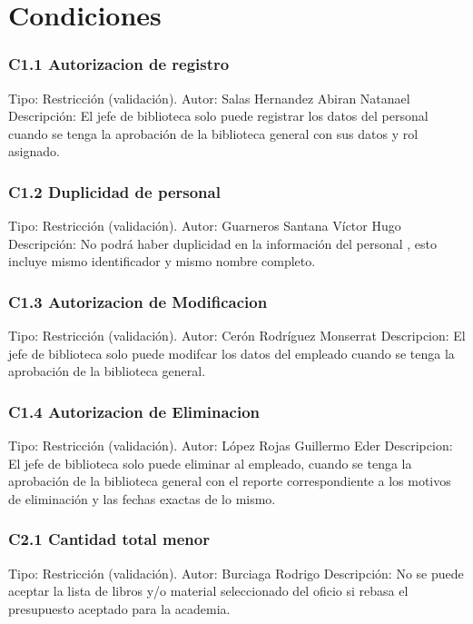\chapter{Condiciones}
\label{appendix:Condiciones}

\subsection{C1.1 Autorizacion de registro}
	\UCli Tipo: Restricción (validación).
	\UCli Autor: Salas Hernandez Abiran Natanael
	\UCli Descripción: El jefe de biblioteca solo puede registrar los datos del personal cuando se tenga la aprobación de la biblioteca general con sus datos y rol asignado.

\subsection{C1.2 Duplicidad de personal}
	\UCli Tipo: Restricción (validación).
	\UCli Autor: Guarneros Santana Víctor Hugo
	\UCli Descripción: No podrá haber duplicidad en la información del personal , esto incluye mismo identificador y mismo nombre completo.

\subsection{C1.3 Autorizacion de Modificacion}
	\UCli Tipo: Restricción (validación).
	\UCli Autor: Cerón Rodríguez Monserrat
	\UCli Descripcion: El jefe de biblioteca solo puede modifcar los datos del empleado cuando se tenga la aprobación de la biblioteca general.

\subsection{C1.4 Autorizacion de Eliminacion}
	\UCli Tipo: Restricción (validación).
	\UCli Autor: López Rojas Guillermo Eder 
	\UCli Descripcion: El jefe de biblioteca solo puede eliminar al empleado, cuando se tenga la aprobación de la biblioteca general con el reporte correspondiente a los motivos de eliminación y las fechas exactas de lo mismo.

\subsection{C2.1 Cantidad total menor}
	\UCli Tipo: Restricción (validación).
	\UCli Autor: Burciaga Rodrigo
	\UCli Descripción: No se puede aceptar la lista de libros y/o material seleccionado del oficio  si rebasa el presupuesto aceptado para la academia.

